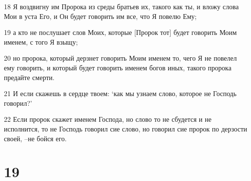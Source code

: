 \par 18 Я воздвигну им Пророка из среды братьев их, такого как ты, и вложу слова Мои в уста Его, и Он будет говорить им все, что Я повелю Ему;
\par 19 а кто не послушает слов Моих, которые [Пророк тот] будет говорить Моим именем, с того Я взыщу;
\par 20 но пророка, который дерзнет говорить Моим именем то, чего Я не повелел ему говорить, и который будет говорить именем богов иных, такого пророка предайте смерти.
\par 21 И если скажешь в сердце твоем: `как мы узнаем слово, которое не Господь говорил?'
\par 22 Если пророк скажет именем Господа, но слово то не сбудется и не исполнится, то не Господь говорил сие слово, но говорил сие пророк по дерзости своей, --не бойся его.

\chapter{19}

